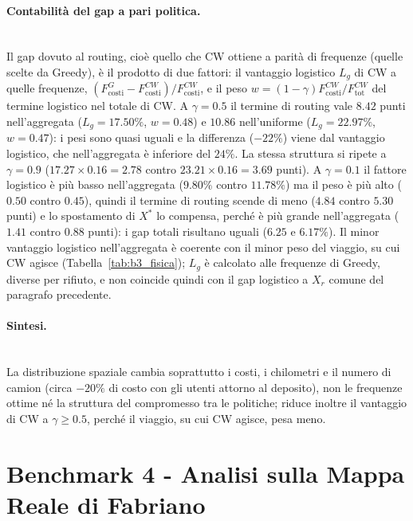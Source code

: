 \paragraph{Contabilità del gap a pari politica.}\mbox{}\\
Il gap dovuto al routing, cioè quello che CW ottiene a parità di frequenze (quelle scelte da Greedy), è il prodotto di due fattori: il vantaggio logistico $L_g$ di CW a quelle frequenze, $(F_{\mathrm{costi}}^{G}-F_{\mathrm{costi}}^{CW})/F_{\mathrm{costi}}^{CW}$, e il peso $w=(1-\gamma)F_{\mathrm{costi}}^{CW}/F_{\mathrm{tot}}^{CW}$ del termine logistico nel totale di CW. A $\gamma=0.5$ il termine di routing vale $8.42$ punti nell'aggregata ($L_g=17.50\%$, $w=0.48$) e $10.86$ nell'uniforme ($L_g=22.97\%$, $w=0.47$): i pesi sono quasi uguali e la differenza ($-22\%$) viene dal vantaggio logistico, che nell'aggregata è inferiore del $24\%$. La stessa struttura si ripete a $\gamma=0.9$ ($17.27\times0.16=2.78$ contro $23.21\times0.16=3.69$ punti). A $\gamma=0.1$ il fattore logistico è più basso nell'aggregata ($9.80\%$ contro $11.78\%$) ma il peso è più alto ($0.50$ contro $0.45$), quindi il termine di routing scende di meno ($4.84$ contro $5.30$ punti) e lo spostamento di $X^*$ lo compensa, perché è più grande nell'aggregata ($1.41$ contro $0.88$ punti): i gap totali risultano uguali ($6.25$ e $6.17\%$). Il minor vantaggio logistico nell'aggregata è coerente con il minor peso del viaggio, su cui CW agisce (Tabella~\ref{tab:b3_fisica}); $L_g$ è calcolato alle frequenze di Greedy, diverse per rifiuto, e non coincide quindi con il gap logistico a $X_r$ comune del paragrafo precedente.

\paragraph{Sintesi.}\mbox{}\\
La distribuzione spaziale cambia soprattutto i costi, i chilometri e il numero di camion (circa $-20\%$ di costo con gli utenti attorno al deposito), non le frequenze ottime né la struttura del compromesso tra le politiche; riduce inoltre il vantaggio di CW a $\gamma\ge0.5$, perché il viaggio, su cui CW agisce, pesa meno.



\section{Benchmark 4 - Analisi sulla Mappa Reale di Fabriano}\label{se:b4}

